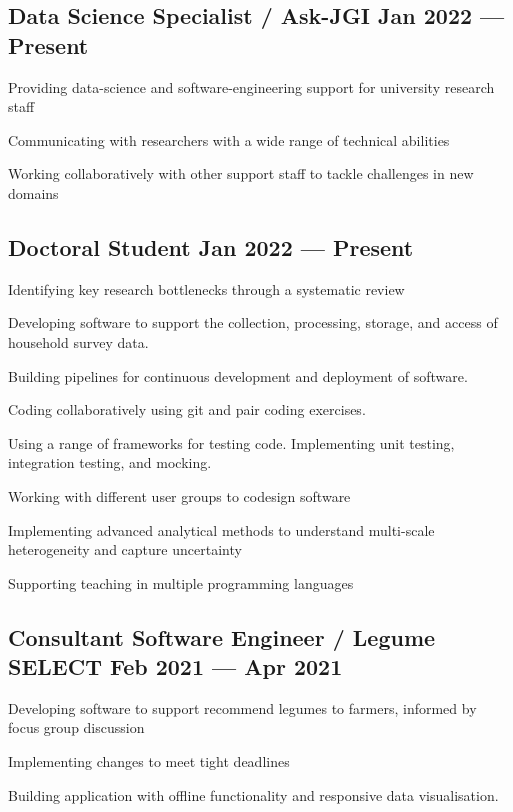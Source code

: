 \documentclass[letter,10pt]{article}
\begin{document}
\subsection{{Data Science Specialist / Ask-JGI \hfill Jan 2022 --- Present}}
\begin{zitemize}
\item Providing data-science and software-engineering 
support for university research staff
\item Communicating with researchers with a wide range of technical abilities
\item Working collaboratively with other support staff
to tackle challenges in new domains
\end{zitemize}

\subsection{{Doctoral Student \hfill Jan 2022 --- Present}}
\begin{zitemize}
\item Identifying key research bottlenecks through a systematic
review
\item Developing software to support the collection, processing,
storage, and access of household survey data.
\item Building pipelines for continuous development and 
deployment of software.
\item Coding collaboratively using git and pair coding 
exercises.
\item Using a range of frameworks for testing code. 
Implementing unit testing, integration testing, and mocking.
\item Working with different user groups to codesign software
\item Implementing advanced analytical methods to understand
multi-scale heterogeneity and capture uncertainty
\item Supporting teaching in multiple programming languages
\end{zitemize}

\subsection{{Consultant Software Engineer / Legume SELECT \hfill Feb 2021 --- Apr 2021}}
\begin{zitemize}
\item Developing software to support recommend
legumes to farmers, informed by focus group discussion
\item Implementing changes to meet tight deadlines
\item Building application with offline functionality and
responsive data visualisation.
\end{zitemize}
\end{document}
